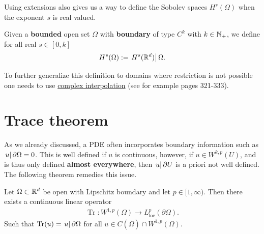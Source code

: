 \documentclass[
    a4paper,
    DIV=14,
    abstract=true,
    numbers=noenddot
]{scrartcl}
\begin{document}
Using extensions also gives us a way to define the Sobolev spaces $H^s(\Omega)$ when the exponent $s$ is real valued.
\begin{definition}
	Given a \textbf{bounded} open set $\Omega$ with \textbf{boundary} of type $C^k$ with $k \in \mathbb{N}_+$, we define for all real $s \in [0,k]$
	\begin{align*}
		H^s(\Omega):=\left.H^s(\mathbb{R}^d)\right|{\Omega} .
	\end{align*}
\end{definition}
To further generalize this definition to domains where restriction is not possible one needs to use \href{https://en.wikipedia.org/wiki/Interpolation_space}{complex interpolation} (see for example \cite{taylor2013partial} pages 321-333).

\section{Trace theorem}\label{trace sec}
As we already discussed, a PDE often incorporates boundary information such as $\left.u\right|{\partial \Omega}=0$. This is well defined if $u$ is continuous, however, if  $u \in  W^{k,p}(U)$, and is thus only defined \textbf{almost everywhere}, then $\left.u\right|{\partial  U}$ is a priori not well defined. The following theorem remedies this issue.
\begin{proposition}[Trace]\label{trace}
	Let $\Omega \subset \mathbb{R}^d$ be open with Lipschitz boundary and let $p\in[1,\infty)$. Then there exists a continuous linear operator
	\begin{align*}
		\operatorname{Tr}: W^{1,p}(\Omega)\to L^p_{\mathrm{loc}}(\partial \Omega) .
	\end{align*}
	Such that $\operatorname{Tr}(u) =\left.u\right|{\partial \Omega} $ for all $u \in C(\overline{\Omega}) \cap W^{1,p}(\Omega)$.
\end{proposition}
\end{document}

